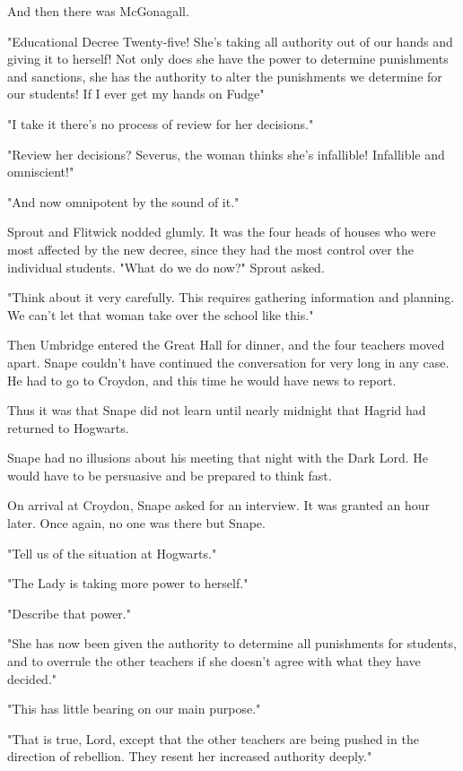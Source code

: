 And then there was McGonagall.

"Educational Decree Twenty-five! She's taking all authority out of our hands and giving it to herself! Not only does she have the power to determine punishments and sanctions, she has the authority to alter the punishments we determine for our students! If I ever get my hands on Fudge{\el}"

"I take it there's no process of review for her decisions."

"Review her decisions? Severus, the woman thinks she's infallible! Infallible and omniscient!"

"And now omnipotent by the sound of it."

Sprout and Flitwick nodded glumly. It was the four heads of houses who were most affected by the new decree, since they had the most control over the individual students. "What do we do now?" Sprout asked.

"Think about it very carefully. This requires gathering information and planning. We can't let that woman take over the school like this."

Then Umbridge entered the Great Hall for dinner, and the four teachers moved apart. Snape couldn't have continued the conversation for very long in any case. He had to go to Croydon, and this time he would have news to report.

Thus it was that Snape did not learn until nearly midnight that Hagrid had returned to Hogwarts.

\sbreak

Snape had no illusions about his meeting that night with the Dark Lord. He would have to be persuasive and be prepared to think fast.

On arrival at Croydon, Snape asked for an interview. It was granted an hour later. Once again, no one was there but Snape.

"Tell us of the situation at Hogwarts."

"The Lady is taking more power to herself."

"Describe that power."

"She has now been given the authority to determine all punishments for students, and to overrule the other teachers if she doesn't agree with what they have decided."

"This has little bearing on our main purpose."

"That is true, Lord, except that the other teachers are being pushed in the direction of rebellion. They resent her increased authority deeply."

